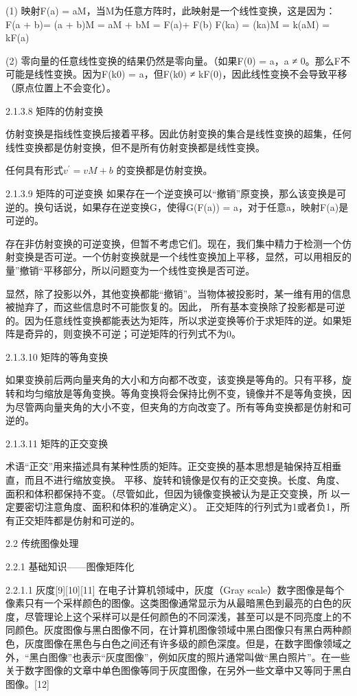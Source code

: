 (1) 映射F(a) = aM，当M为任意方阵时，此映射是一个线性变换，这是因为：
F(a + b)= (a + b)M = aM + bM = F(a)+ F(b)
F(ka) = (ka)M = k(aM) = kF(a)

(2) 零向量的任意线性变换的结果仍然是零向量。（如果F(0) = a，a ≠ 0。那么F不可能是线性变换。因为F(k0) = a，但F(k0) ≠ kF(0)，因此线性变换不会导致平移（原点位置上不会变化）。

2.1.3.8 矩阵的仿射变换

仿射变换是指线性变换后接着平移。因此仿射变换的集合是线性变换的超集，任何线性变换都是仿射变换，但不是所有仿射变换都是线性变换。

任何具有形式$ v^\prime  = vM + b$ 的变换都是仿射变换。

2.1.3.9 矩阵的可逆变换
如果存在一个逆变换可以“撤销”原变换，那么该变换是可逆的。换句话说，如果存在逆变换G，使得G(F(a)) = a，对于任意a，映射F(a)是可逆的。

存在非仿射变换的可逆变换，但暂不考虑它们。现在，我们集中精力于检测一个仿射变换是否可逆。一个仿射变换就是一个线性变换加上平移，显然，可以用相反的量”撤销“平移部分，所以问题变为一个线性变换是否可逆。

显然，除了投影以外，其他变换都能“撤销”。当物体被投影时，某一维有用的信息被抛弃了，而这些信息时不可能恢复的。因此，
所有基本变换除了投影都是可逆的。因为任意线性变换都能表达为矩阵，所以求逆变换等价于求矩阵的逆。如果矩阵是奇异的，则变换不可逆；可逆矩阵的行列式不为0。

2.1.3.10 矩阵的等角变换

如果变换前后两向量夹角的大小和方向都不改变，该变换是等角的。只有平移，旋转和均匀缩放是等角变换。等角变换将会保持比例不变，镜像并不是等角变换，因为尽管两向量夹角的大小不变，但夹角的方向改变了。所有等角变换都是仿射和可逆的。

2.1.3.11 矩阵的正交变换

术语“正交”用来描述具有某种性质的矩阵。正交变换的基本思想是轴保持互相垂直，而且不进行缩放变换。
平移、旋转和镜像是仅有的正交变换。长度、角度、面积和体积都保持不变。（尽管如此，但因为镜像变换被认为是正交变换，所
以一定要密切注意角度、面积和体积的准确定义）。
正交矩阵的行列式为1或者负1，所有正交矩阵都是仿射和可逆的。

2.2 传统图像处理

2.2.1 基础知识——图像矩阵化

2.2.1.1 灰度[9][10][11]
	在电子计算机领域中，灰度（Gray scale）数字图像是每个像素只有一个采样颜色的图像。这类图像通常显示为从最暗黑色到最亮的白色的灰度，尽管理论上这个采样可以是任何颜色的不同深浅，甚至可以是不同亮度上的不同颜色。灰度图像与黑白图像不同，在计算机图像领域中黑白图像只有黑白两种颜色，灰度图像在黑色与白色之间还有许多级的颜色深度。但是，在数字图像领域之外，“黑白图像”也表示“灰度图像”，例如灰度的照片通常叫做“黑白照片”。在一些关于数字图像的文章中单色图像等同于灰度图像，在另外一些文章中又等同于黑白图像。[12]

